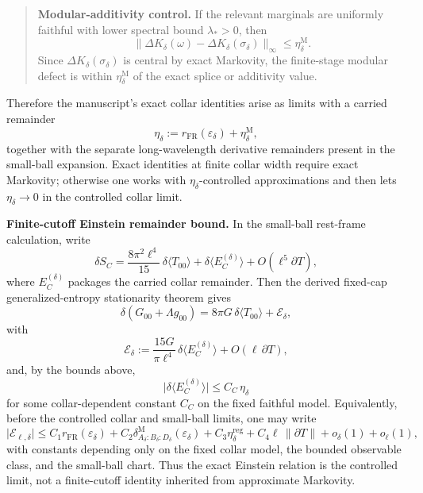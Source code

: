 \begin{quote}
\textbf{Modular-additivity control.} If the relevant marginals are uniformly faithful with lower spectral bound \(\lambda_\ast>0\), then
\[
\|\Delta K_\delta(\omega)-\Delta K_\delta(\sigma_\delta)\|_\infty
\le
\eta_\delta^{\mathrm M}.
\]
Since \(\Delta K_\delta(\sigma_\delta)\) is central by exact Markovity, the finite-stage modular defect is within \(\eta_\delta^{\mathrm M}\) of the exact splice or additivity value.
\end{quote}

Therefore the manuscript's exact collar identities arise as limits with a carried remainder
\[
\eta_\delta
:=
r_{\mathrm{FR}}(\varepsilon_\delta)
+
\eta_\delta^{\mathrm M},
\]
together with the separate long-wavelength derivative remainders present in the small-ball expansion. Exact identities at finite collar width require exact Markovity; otherwise one works with \(\eta_\delta\)-controlled approximations and then lets \(\eta_\delta\to0\) in the controlled collar limit.

\textbf{Finite-cutoff Einstein remainder bound.} In the small-ball rest-frame calculation, write
\[
\delta S_C
=
\frac{8\pi^2\ell^4}{15}\,\delta\langle T_{00}\rangle
+
\delta\langle E_C^{(\delta)}\rangle
+
O(\ell^5\partial T),
\]
where \(E_C^{(\delta)}\) packages the carried collar remainder. Then the derived fixed-cap generalized-entropy stationarity theorem gives
\[
\delta\!\left(G_{00}+\Lambda g_{00}\right)
=
8\pi G\,\delta\langle T_{00}\rangle
+
\mathcal E_\delta,
\]
with
\[
\mathcal E_\delta
:=
\frac{15G}{\pi\ell^4}\,
\delta\langle E_C^{(\delta)}\rangle
+
O(\ell\,\partial T),
\]
and, by the bounds above,
\[
\bigl|
\delta\langle E_C^{(\delta)}\rangle
\bigr|
\le
C_C\,\eta_\delta
\]
for some collar-dependent constant \(C_C\) on the fixed faithful model.
Equivalently, before the controlled collar and small-ball limits, one may write
\[
\bigl|\mathcal E_{\ell,\delta}\bigr|
\le
C_1 r_{\mathrm{FR}}(\varepsilon_\delta)
+C_2\delta^{\mathrm M}_{A_\delta:B_\delta:D_\delta}(\varepsilon_\delta)
+C_3\eta^{\mathrm{reg}}_\delta
+C_4\ell\,\|\partial T\|
+o_\delta(1)+o_\ell(1),
\]
with constants depending only on the fixed collar model, the bounded observable class, and the
small-ball chart. Thus the exact Einstein relation is the controlled limit, not a finite-cutoff
identity inherited from approximate Markovity.

